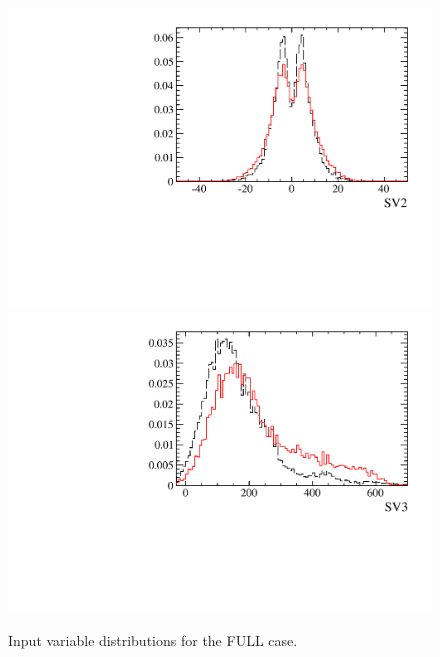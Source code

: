 \begin{figure} [htb!]
\begin{center}
\includegraphics[scale=0.20]{figs/SV2FULL.pdf}
\includegraphics[scale=0.20]{figs/SV3FULL.pdf}
\caption{Input variable distributions for the FULL case. \label{fig:MVAhistos_FULL2}}
\end{center}
\end{figure}

